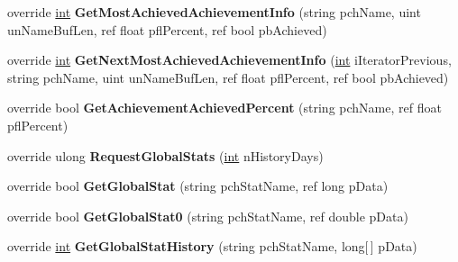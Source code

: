 \begin{DoxyCompactItemize}
\item 
\hypertarget{classValve_1_1Steamworks_1_1CSteamUserStats_a4ad3eb1958edf6312bf293cb3594704d}{}override \hyperlink{SDL__thread_8h_a6a64f9be4433e4de6e2f2f548cf3c08e}{int} {\bfseries Get\+Most\+Achieved\+Achievement\+Info} (string pch\+Name, uint un\+Name\+Buf\+Len, ref float pfl\+Percent, ref bool pb\+Achieved)\label{classValve_1_1Steamworks_1_1CSteamUserStats_a4ad3eb1958edf6312bf293cb3594704d}

\item 
\hypertarget{classValve_1_1Steamworks_1_1CSteamUserStats_a13dd533a55c5428945a4ec5cf726f3e4}{}override \hyperlink{SDL__thread_8h_a6a64f9be4433e4de6e2f2f548cf3c08e}{int} {\bfseries Get\+Next\+Most\+Achieved\+Achievement\+Info} (\hyperlink{SDL__thread_8h_a6a64f9be4433e4de6e2f2f548cf3c08e}{int} i\+Iterator\+Previous, string pch\+Name, uint un\+Name\+Buf\+Len, ref float pfl\+Percent, ref bool pb\+Achieved)\label{classValve_1_1Steamworks_1_1CSteamUserStats_a13dd533a55c5428945a4ec5cf726f3e4}

\item 
\hypertarget{classValve_1_1Steamworks_1_1CSteamUserStats_a836e5fc6d81b518a6643ef4946b28cf3}{}override bool {\bfseries Get\+Achievement\+Achieved\+Percent} (string pch\+Name, ref float pfl\+Percent)\label{classValve_1_1Steamworks_1_1CSteamUserStats_a836e5fc6d81b518a6643ef4946b28cf3}

\item 
\hypertarget{classValve_1_1Steamworks_1_1CSteamUserStats_a1a08bec027eff94a497bae2ec01fd83c}{}override ulong {\bfseries Request\+Global\+Stats} (\hyperlink{SDL__thread_8h_a6a64f9be4433e4de6e2f2f548cf3c08e}{int} n\+History\+Days)\label{classValve_1_1Steamworks_1_1CSteamUserStats_a1a08bec027eff94a497bae2ec01fd83c}

\item 
\hypertarget{classValve_1_1Steamworks_1_1CSteamUserStats_ab8123047f90f77e9282ac82c66b7dd6b}{}override bool {\bfseries Get\+Global\+Stat} (string pch\+Stat\+Name, ref long p\+Data)\label{classValve_1_1Steamworks_1_1CSteamUserStats_ab8123047f90f77e9282ac82c66b7dd6b}

\item 
\hypertarget{classValve_1_1Steamworks_1_1CSteamUserStats_a4c748c8709abb8701a5c1cdb6210d783}{}override bool {\bfseries Get\+Global\+Stat0} (string pch\+Stat\+Name, ref double p\+Data)\label{classValve_1_1Steamworks_1_1CSteamUserStats_a4c748c8709abb8701a5c1cdb6210d783}

\item 
\hypertarget{classValve_1_1Steamworks_1_1CSteamUserStats_aa0c564d05160784349fe04de46574aba}{}override \hyperlink{SDL__thread_8h_a6a64f9be4433e4de6e2f2f548cf3c08e}{int} {\bfseries Get\+Global\+Stat\+History} (string pch\+Stat\+Name, long\mbox{[}$\,$\mbox{]} p\+Data)\label{classValve_1_1Steamworks_1_1CSteamUserStats_aa0c564d05160784349fe04de46574aba}


\end{DoxyCompactItemize}
